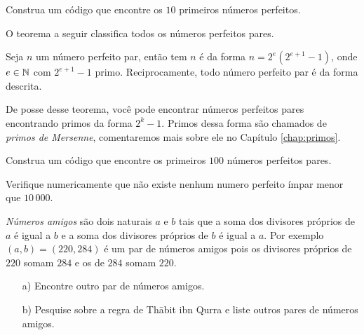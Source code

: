 \begin{exercise}
  Construa um código que encontre os $10$ primeiros números perfeitos.
\end{exercise}

O teorema a seguir classifica todos os números perfeitos pares.

\begin{theorem}
  Seja $n$ um número perfeito par, então
  tem $n$ é da forma ${n = 2^e(2^{e+1} - 1)}$, onde
  $e \in \mathbb{N}$ com $2^{e+1} - 1$ primo. Reciprocamente, 
  todo número perfeito par é da forma descrita.
\end{theorem}

De posse desse teorema, você pode encontrar números
perfeitos pares encontrando primos da forma $2^k - 1$.
Primos dessa forma são chamados de \emph{primos
de Mersenne}, comentaremos
mais sobre ele no Capítulo \ref{chap:primos}.

\begin{exercise}
  Construa um código que encontre os primeiros
  $100$ números perfeitos pares.
\end{exercise}

\begin{exercise}
  Verifique numericamente que não existe nenhum
  numero perfeito ímpar menor que $10\,000$.
\end{exercise}

\begin{exercise}
  \emph{Números amigos} são dois naturais $a$ e $b$ tais que
  a soma dos divisores próprios de $a$ é igual
  a $b$ e a soma dos divisores próprios de $b$ é
  igual a $a$.  
  Por exemplo $(a,b) = (220, 284)$ é um par de números amigos pois
  os divisores próprios de $220$ somam $284$ e os
  de $284$ somam $220$.
  \begin{enumerate}
    \item[a)] Encontre outro par de números amigos.
    \item[b)] Pesquise sobre a regra de Thābit ibn Qurra
    e liste outros pares de números amigos.
  \end{enumerate}
\end{exercise}


